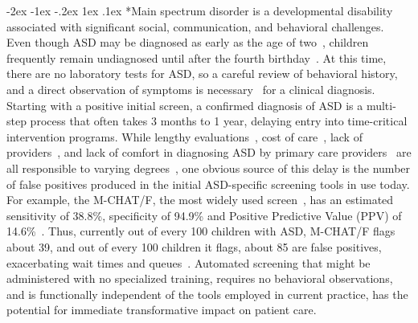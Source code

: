 \documentclass[onecolumn,,10pt]{IEEEtran}
\makeatletter
\renewcommand\section{\@startsection {section}{1}{\z@}%
  {-2ex \@plus -1ex \@minus -.2ex}%
  {1ex \@plus.1ex}%
  {\Large\bfseries\scshape}}
\makeatother
\begin{document}
  \section*{Main}
   spectrum disorder is a developmental disability associated with significant social, communication, and behavioral challenges.
Even though ASD may be diagnosed as early as the  age of two~\cite{cdc},  children frequently remain undiagnosed  until after the fourth birthday~\cite{pmid24529515}. At this
time, there are no laboratory tests for ASD, so a careful review of behavioral history, and a direct
observation of symptoms is
necessary~\cite{volkmar2014practice,hyman2020identification} for a clinical diagnosis.  Starting with a positive initial screen, a confirmed diagnosis of ASD is a   multi-step process that often takes 3 months to 1 year,  delaying entry into time-critical intervention programs. While   lengthy evaluations~\cite{kalb2012determinants}, cost of care~\cite{bisgaier2011access},  lack of providers~\cite{fenikile2015barriers}, and lack of comfort in diagnosing ASD by primary care providers~\cite{fenikile2015barriers} are all responsible to varying degrees~\cite{gordon2016whittling}, one  obvious source of this delay is the number of false positives produced in the initial ASD-specific screening tools in use today. For example, the  M-CHAT/F, the most widely used screen~\cite{robins2014validation,hyman2020identification},  has an estimated  sensitivity of 38.8\%, specificity of 94.9\% and Positive Predictive Value (PPV) of 14.6\%~\cite{pmid31562252}. Thus,  currently  out of every 100 children with ASD,  M-CHAT/F flags about 39, and out of every 100 children it flags, about 85 are false positives, exacerbating  wait times and queues~\cite{gordon2016whittling}.  Automated   screening  that might be administered with  no specialized training, requires no behavioral observations, and is functionally independent of the tools employed in current practice,  has the potential for  immediate transformative  impact on patient care.
\end{document}
